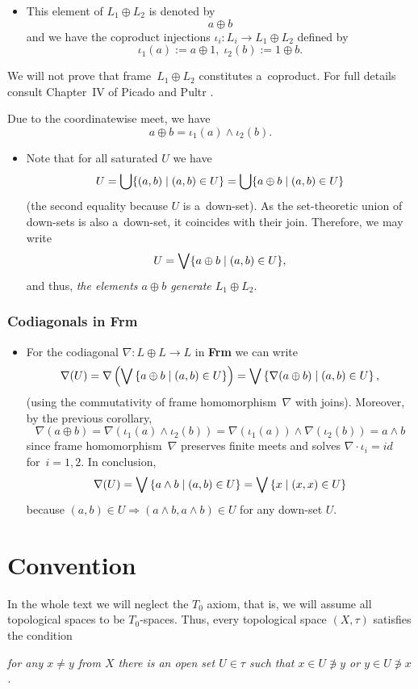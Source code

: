 \begin{itemize}
\item This element of $L_1 \oplus L_2$ is denoted by
\[
  a \oplus b
\]
and we have the coproduct injections $\iota_i: L_i \to L_1 \oplus
L_2$ defined by
\[
  \iota_1(a) := a \oplus 1, \; \iota_2(b) := 1 \oplus b.
\]
\end{itemize}

We will not prove that frame~$L_1 \oplus L_2$ constitutes a~coproduct.
For full details consult Chapter~IV of Picado and Pultr
\cite{picado-pultr12}.

\begin{cor*}
Due to the coordinatewise meet, we have
\[
  a \oplus b = \iota_1(a) \wedge \iota_2(b).
\]
\end{cor*}

\begin{itemize}
\item Note that for all saturated $U$ we have
\[
  U
  = \bigcup \{ (a, b) \mid (a, b)\in U \} = \bigcup \{ a \oplus b \mid (a, b)\in
  U \}
\]
(the second equality because $U$ is a~down-set).
As the set-theoretic union of down-sets is also a~down-set, it coincides with
their join.
Therefore, we may write
\[
  U
  = \bigvee \{ a \oplus b \mid (a, b)\in U \},
\]
and thus, \emph{the elements $a \oplus b$ generate $L_1 \oplus L_2$\/}.
\end{itemize}

\subsubsection*{Codiagonals in Frm}

\begin{itemize}
\item \label{codiag-in-Frm}
For the codiagonal $\nabla\colon L \oplus L \to L$ in {\bf Frm} we can write
\[
  \nabla(U)
  = \nabla \left( \bigvee \left\{ a \oplus b \mid (a, b)\in U \right\} \right)
  = \bigvee \left\{ \nabla(a \oplus b) \mid (a, b)\in U \right\},
\]
(using the commutativity of frame homomorphism~$\nabla$ with joins).
Moreover, by the previous corollary,
\[
  \nabla(a \oplus b)
  = \nabla( \iota_1(a) \wedge \iota_2(b) )
  = \nabla(\iota_1(a)) \wedge \nabla(\iota_2(b))
  = a \wedge b
\]
since frame homomorphism~$\nabla$ preserves finite meets and solves
$\nabla\cdot \iota_i = id$ for~$i = 1, 2$.
In conclusion,
\[
  \nabla(U)
  = \bigvee \left\{ a \wedge b \mid (a, b)\in U \right\}
  = \bigvee \left\{ x \mid (x, x)\in U \right\}
\]
because $(a, b)\in U \Rightarrow (a \wedge b, a \wedge b)\in U$ for any
down-set $U$.
\end{itemize}

\section*{Convention}

In the whole text we will neglect the $T_0$ axiom, that is, we will assume all
topological spaces to be $T_0$-spaces.
Thus, every topological space $(X, \tau)$ satisfies the condition
\begin{center} \it
  for any $x \ne y$ from $X$ there is an open set $U \in \tau$ such that $x \in
  U \not\owns y$ or $y \in U \not\owns x$.
\end{center}

